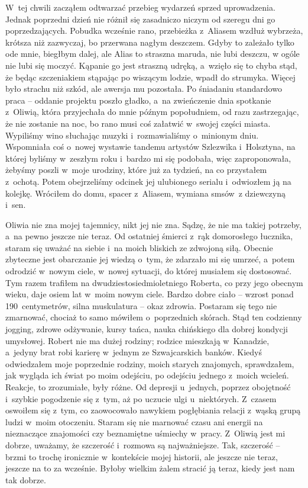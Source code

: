 W~tej chwili zacząłem odtwarzać przebieg wydarzeń sprzed uprowadzenia. Jednak poprzedni dzień nie różnił się zasadniczo niczym od szeregu dni go poprzedzających. Pobudka wcześnie rano, przebieżka z~Aliasem wzdłuż wybrzeża, krótsza niż zazwyczaj, bo przerwana nagłym deszczem. Gdyby to zależało tylko ode mnie, biegłbym dalej, ale Alias to straszna maruda, nie lubi deszczu, w ogóle nie lubi się moczyć. Kąpanie go jest straszną udręką, a~wzięło się to chyba stąd, że będąc szczeniakiem stąpając po wiszącym lodzie, wpadł do strumyka. Więcej było strachu niż szkód, ale awersja mu pozostała. Po śniadaniu standardowo praca -- oddanie projektu poszło gładko, a~na zwieńczenie dnia spotkanie z~Oliwią, która przyjechała do mnie późnym popołudniem, od razu zastrzegając, że nie zostanie na noc, bo rano musi coś załatwić w~swojej części miasta. Wypiliśmy wino słuchając muzyki i~rozmawialiśmy o~minionym dniu. Wspomniała coś o~nowej wystawie tandemu artystów Szlezwika i~Holsztyna, na której byliśmy w~zeszłym roku i~bardzo mi się podobała, więc zaproponowała, żebyśmy poszli w~moje urodziny, które już za tydzień, na co przystałem z~ochotą. Potem obejrzeliśmy odcinek jej ulubionego serialu i~odwiozłem ją na kolejkę. Wróciłem do domu, spacer z~Aliasem, wymiana smsów~z dziewczyną i~sen.

Oliwia nie zna mojej tajemnicy, nikt jej nie zna. Sądzę, że nie ma takiej potrzeby, a~na pewno jeszcze nie teraz. Od ostatniej śmierci z~rąk domorosłego łucznika, staram się uważać na siebie i~na moich bliskich ze zdwojoną siłą. Obecnie zbyteczne jest obarczanie jej wiedzą o~tym, że zdarzało mi się umrzeć, a~potem odrodzić w~nowym ciele, w~nowej sytuacji, do której musiałem się dostosować. Tym razem trafiłem na dwudziestosiedmioletniego Roberta, co przy jego obecnym wieku, daje osiem lat w~moim nowym ciele. Bardzo dobre ciało -- wzrost ponad 190~centymetrów, silna muskulatura -- okaz zdrowia. Postaram się tego nie zmarnować, chociaż to samo mówiłem o~poprzednich skórach. Stąd ten codzienny jogging, zdrowe odżywanie, kursy tańca, nauka chińskiego dla dobrej kondycji umysłowej. Robert nie ma dużej rodziny; rodzice mieszkają w~Kanadzie, a~jedyny brat robi karierę w~jednym ze Szwajcarskich banków. Kiedyś odwiedzałem moje poprzednie rodziny, moich starych znajomych, sprawdzałem, jak wygląda ich świat po moim odejściu, po odejściu jednego z~moich wcieleń. Reakcje, to zrozumiałe, były różne. Od depresji u~jednych, poprzez obojętność i~szybkie pogodzenie się z~tym, aż po uczucie ulgi u~niektórych. Z~czasem oswoiłem się z~tym, co zaowocowało nawykiem pogłębiania relacji z~wąską grupą ludzi w~moim otoczeniu. Staram się nie marnować czasu ani energii na nieznaczące znajomości czy beznamiętne uśmiechy w~pracy. Z~Oliwią jest mi dobrze, uważamy, że szczerość i~rozmowa są najważniejsze. Tak, szczerość -- brzmi to trochę ironicznie w~kontekście mojej historii, ale jeszcze nie teraz, jeszcze na to za wcześnie. Byłoby wielkim żalem stracić ją teraz, kiedy jest nam tak dobrze.

